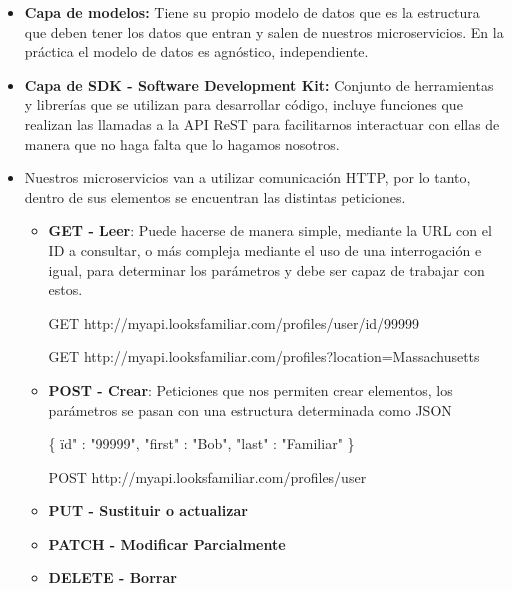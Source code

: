 \documentclass[12pt, twoside, openright]{report} %
\begin{document}
\begin{itemize}
	\item \textbf{Capa de modelos:} Tiene su propio modelo de datos que es la estructura que deben tener los datos que entran y salen de nuestros microservicios. En la práctica el modelo de datos es agnóstico, independiente.
	\item \textbf{Capa de SDK - Software Development Kit:} Conjunto de herramientas y librerías que se utilizan para desarrollar código, incluye funciones que realizan las llamadas a la API ReST para facilitarnos interactuar con ellas de manera que no haga falta que lo hagamos nosotros.
	\item Nuestros microservicios van a utilizar comunicación HTTP, por lo tanto, dentro de sus elementos se encuentran las distintas peticiones.
	      \begin{itemize}
		      \item \textbf{GET - Leer}: Puede hacerse de manera simple, mediante la URL con el ID a consultar, o más compleja mediante el uso de una interrogación e igual, para determinar los parámetros y debe ser capaz de trabajar con estos.

		            GET http://myapi.looksfamiliar.com/profiles/user/id/99999

		            GET http://myapi.looksfamiliar.com/profiles?location=Massachusetts

		      \item \textbf{POST - Crear}: Peticiones que nos permiten crear elementos, los parámetros se pasan con una estructura determinada como JSON

		            \{ \"id" : "99999", "first" : "Bob", "last" : "Familiar" \}

		            POST http://myapi.looksfamiliar.com/profiles/user

		      \item \textbf{PUT - Sustituir o actualizar}
		      \item \textbf{PATCH - Modificar Parcialmente}
		      \item \textbf{DELETE - Borrar}
	      \end{itemize}
		  \pagebreak


\end{itemize}
\end{document}
